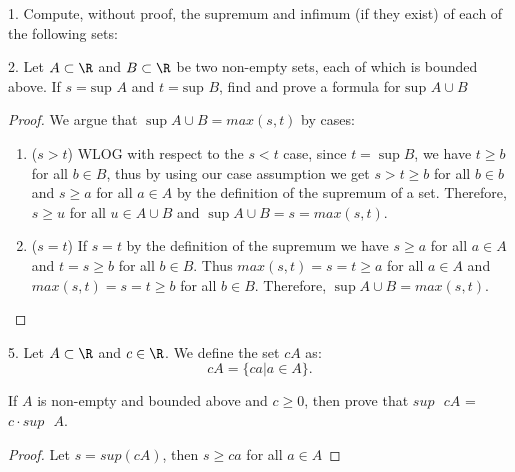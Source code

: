 

1. Compute, without proof, the supremum and infimum (if they exist) of each of the following sets:


2. Let $A \subset \R$ and $B \subset \R$ be two non-empty sets, each of which is bounded above. If $s=\text{sup }A $ and $t=\text{sup }B $, find and prove a formula for $\text{sup } A \cup B$

\begin{proof}
	We argue that $\sup A \cup B = max\left( s, t \right) $ by cases:
	\begin{enumerate}
		\item ($s>t$) WLOG with respect to the $s < t$ case, since $t=\sup B$, we have  $t \ge b$ for all $b \in B$, thus by using our case assumption we get $s > t \ge b$ for all $b \in b$ and $s \ge  a$ for all $a \in A$ by the definition of the supremum of a set. Therefore, $s \ge u$ for all $u \in A \cup B$ and $\sup A \cup B = s = max\left( s, t \right) $.
		\item ($s = t$) If $s=t$ by the definition of the supremum we have $s \ge a$ for all $a \in A$ and $t = s \ge b$ for all $b \in B$. Thus  $max\left( s, t \right) = s = t \ge a$ for all $a \in A$ and $max\left( s, t \right) = s = t \ge b$ for all $b \in B$. Therefore, $\sup A \cup B = max\left( s, t \right) $.
	\end{enumerate}
\end{proof}

5. Let $A \subset \R$ and $c \in \R$. We define the set $cA$ as:
\[
	cA = \{ca | a \in A\}
.\] 

If $A$ is non-empty and bounded above and $c\ge 0$, then prove that $sup \text{ } cA$ = $c \cdot sup \text{ } A $.

\begin{proof}
	Let $s = sup\left( cA \right) $, then $s \ge  ca$ for all $a \in A$	
\end{proof}






